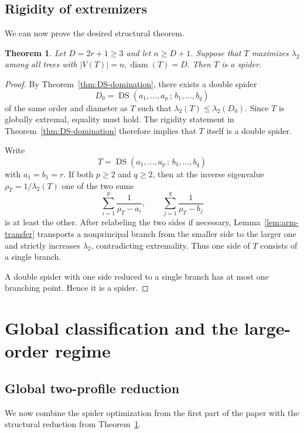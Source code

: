 \documentclass[11pt]{article}
\newtheorem{theorem}{Theorem}[section]
\theoremstyle{remark}
\newcommand{\diam}{\operatorname{diam}}
\newcommand{\DS}{\operatorname{DS}}
\begin{document}
\subsection{Rigidity of extremizers}
We can now prove the desired structural theorem.

\begin{theorem}\label{thm:extremizer-spider}
Let $D=2r+1\ge 3$ and let $n\ge D+1$.
Suppose that $T$ maximizes $\lambda_2$ among all trees with
$|V(T)|=n, \diam(T)=D.$
Then $T$ is a spider.
\end{theorem}

\begin{proof}
By Theorem~\ref{thm:DS-domination}, there exists a double spider
$$
D_0=\DS(a_1,\dots,a_p\,;\,b_1,\dots,b_q)
$$
of the same order and diameter as $T$ such that $\lambda_2(T)\le \lambda_2(D_0)$. Since $T$ is
globally extremal, equality must hold. The rigidity statement in Theorem~\ref{thm:DS-domination}
therefore implies that $T$ itself is a double spider.

Write
$$
T=\DS(a_1,\dots,a_p\,;\,b_1,\dots,b_q)
$$
with $a_1=b_1=r$. If both $p\ge2$ and $q\ge2$, then at the inverse eigenvalue
$\rho_T=1/\lambda_2(T)$ one of the two sums
$$
\sum_{i=1}^p \frac1{\rho_T-a_i},
\qquad
\sum_{j=1}^q \frac1{\rho_T-b_j}
$$
is at least the other. After relabeling the two sides if necessary, Lemma~\ref{lem:arm-transfer}
transports a nonprincipal branch from the smaller side to the larger one and strictly increases
$\lambda_2$, contradicting extremality. Thus one side of $T$ consists of a single branch.

A double spider with one side reduced to a single branch has at most one branching point. Hence it
is a spider.
\end{proof}

\section{Global classification and the large-order regime}\label{sec:global-classification}

\subsection{Global two-profile reduction}
We now combine the spider optimization from the first part of the paper with the structural reduction
from Theorem~\ref{thm:extremizer-spider}.
\end{document}
